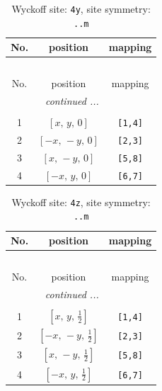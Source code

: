 \documentclass[fleqn,8pt]{jsarticle}
\begin{document}
\renewcommand{\arraystretch}{1.2}
\begin{longtable}{ccc}
\caption{Wyckoff site: {\tt 4y}, site symmetry: {\tt ..m}}
 \\
 \hline \hline
No. & position & mapping \\ \hline \endfirsthead

\multicolumn{2}{l}{\tablename\ \thetable{}} \\
 \hline \hline
No. & position & mapping \\ \hline \endhead

 \hline \hline
\multicolumn{2}{r}{\footnotesize\it continued ...} \\ \endfoot

 \hline \hline
\multicolumn{2}{r}{} \\ \endlastfoot

1 & $\left[ x,\, y,\, 0 \right]$ & {\tt [1,4]} \\ \hline
2 & $\left[ - x,\, - y,\, 0 \right]$ & {\tt [2,3]} \\ \hline
3 & $\left[ x,\, - y,\, 0 \right]$ & {\tt [5,8]} \\ \hline
4 & $\left[ - x,\, y,\, 0 \right]$ & {\tt [6,7]} \\
\end{longtable}
\renewcommand{\arraystretch}{1.2}
\begin{longtable}{ccc}
\caption{Wyckoff site: {\tt 4z}, site symmetry: {\tt ..m}}
 \\
 \hline \hline
No. & position & mapping \\ \hline \endfirsthead

\multicolumn{2}{l}{\tablename\ \thetable{}} \\
 \hline \hline
No. & position & mapping \\ \hline \endhead

 \hline \hline
\multicolumn{2}{r}{\footnotesize\it continued ...} \\ \endfoot

 \hline \hline
\multicolumn{2}{r}{} \\ \endlastfoot

1 & $\left[ x,\, y,\, \frac{1}{2} \right]$ & {\tt [1,4]} \\ \hline
2 & $\left[ - x,\, - y,\, \frac{1}{2} \right]$ & {\tt [2,3]} \\ \hline
3 & $\left[ x,\, - y,\, \frac{1}{2} \right]$ & {\tt [5,8]} \\ \hline
4 & $\left[ - x,\, y,\, \frac{1}{2} \right]$ & {\tt [6,7]} \\
\end{longtable}
\end{document}
